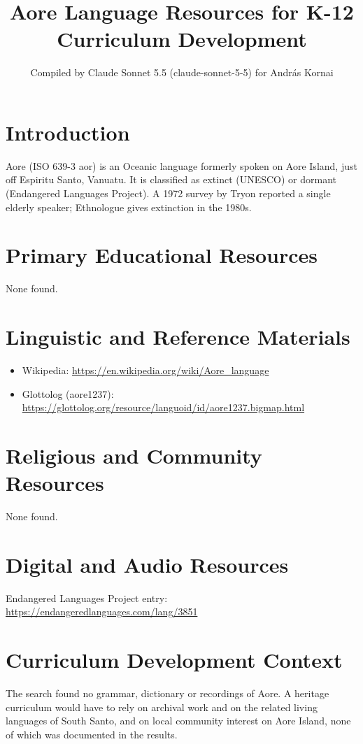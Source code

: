 \documentclass[12pt]{article}
\title{Aore Language Resources for K-12 Curriculum Development}
\author{Compiled by Claude Sonnet 5.5 (claude-sonnet-5-5) for Andr\'as Kornai}
\date{}
\begin{document}
\maketitle

\section{Introduction}
Aore (ISO 639-3 aor) is an Oceanic language formerly spoken on Aore Island, just off Espiritu Santo, Vanuatu. It is classified as extinct (UNESCO) or dormant (Endangered Languages Project). A 1972 survey by Tryon reported a single elderly speaker; Ethnologue gives extinction in the 1980s.

\section{Primary Educational Resources}
None found.

\section{Linguistic and Reference Materials}
\begin{itemize}
\item Wikipedia: \url{https://en.wikipedia.org/wiki/Aore_language}
\item Glottolog (aore1237): \url{https://glottolog.org/resource/languoid/id/aore1237.bigmap.html}
\end{itemize}

\section{Religious and Community Resources}
None found.

\section{Digital and Audio Resources}
Endangered Languages Project entry: \url{https://endangeredlanguages.com/lang/3851}

\section{Curriculum Development Context}
The search found no grammar, dictionary or recordings of Aore. A heritage curriculum would have to rely on archival work and on the related living languages of South Santo, and on local community interest on Aore Island, none of which was documented in the results.
\end{document}
